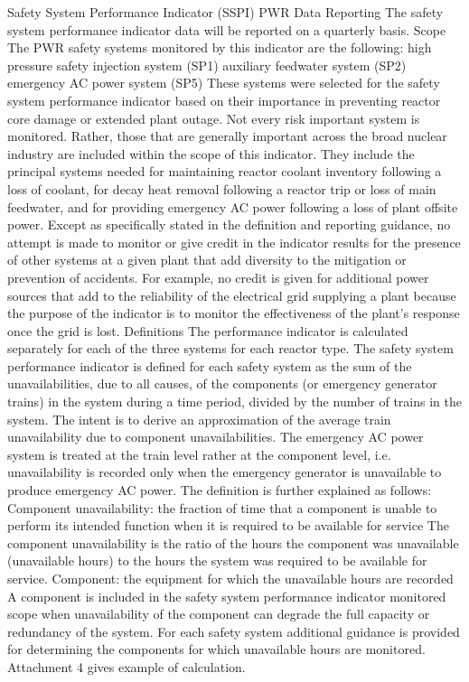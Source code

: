 Safety System Performance Indicator (SSPI) PWR
Data Reporting
The safety system performance indicator data will be reported on a quarterly basis.
Scope
The PWR safety systems monitored by this indicator are the following:
high pressure safety injection system (SP1)
auxiliary feedwater system (SP2)
emergency AC power system (SP5)
These systems were selected for the safety system performance indicator based on their importance in preventing reactor core damage or extended plant outage. Not every risk important system is monitored. Rather, those that are generally important across the broad nuclear industry are included within the scope of this indicator. They include the principal systems needed for maintaining reactor coolant inventory following a loss of coolant, for decay heat removal following a reactor trip or loss of main feedwater, and for providing emergency AC power following a loss of plant offsite power.
Except as specifically stated in the definition and reporting guidance, no attempt is made to monitor or give credit in the indicator results for the presence of other systems at a given plant that add diversity to the mitigation or prevention of accidents. For example, no credit is given for additional power sources that add to the reliability of the electrical grid supplying a plant because the purpose of the indicator is to monitor the effectiveness of the plant's response once the grid is lost.
Definitions
The performance indicator is calculated separately for each of the three systems for each reactor type. The safety system performance indicator is defined for each safety system as the sum of the unavailabilities, due to all causes, of the components (or emergency generator trains) in the system during a time period, divided by the number of trains in the system. The intent is to derive an approximation of the average train unavailability due to component unavailabilities. The emergency AC power system is treated at the train level rather at the component level, i.e. unavailability is recorded only when the emergency generator is unavailable to produce emergency AC power. The definition is further explained as follows:
Component unavailability: the fraction of time that a component is unable to perform its intended function when it is required to be available for service
The component unavailability is the ratio of the hours the component was unavailable (unavailable hours) to the hours the system was required to be available for service.
Component: the equipment for which the unavailable hours are recorded
A component is included in the safety system performance indicator monitored scope when unavailability of the component can degrade the full capacity or redundancy of the system. For each safety system additional guidance is provided for determining the components for which unavailable hours are monitored. Attachment 4 gives example of calculation.
